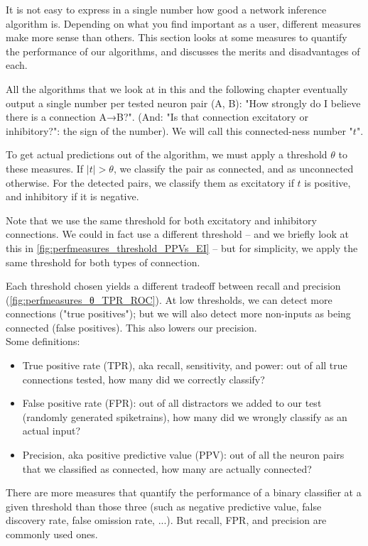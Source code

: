 It is not easy to express in a single number how good a network inference algorithm is. Depending on what you find important as a user, different measures make more sense than others. This section looks at some measures to quantify the performance of our algorithms, and discusses the merits and disadvantages of each.

All the algorithms that we look at in this and the following chapter eventually output a single number per tested neuron pair (A, B): "How strongly do I believe there is a connection A→B?". (And: "Is that connection excitatory or inhibitory?": the sign of the number). We will call this connected-ness number "$t$".

To get actual predictions out of the algorithm,
we must apply a threshold $θ$ to these measures. If $|t| > θ$, we classify the pair as connected, and as unconnected otherwise. For the detected pairs, we classify them as excitatory if $t$ is positive, and inhibitory if it is negative.

Note that we use the same threshold for both excitatory and inhibitory connections. We could in fact use a different threshold -- and we briefly look at this in \cref{fig:perfmeasures_threshold_PPVs_EI} -- but for simplicity, we apply the same threshold for both types of connection.

Each threshold chosen yields a different tradeoff between recall and precision (\cref{fig:perfmeasures_θ_TPR_ROC}). At low thresholds, we can detect more connections ("true positives"); but we will also detect more non-inputs as being connected (false positives). This also lowers our precision.\\
Some definitions:
\begin{itemize}
    \item True positive rate (TPR), aka recall, sensitivity, and power: out of all true connections tested, how many did we correctly classify?
    \item False positive rate (FPR): out of all distractors we added to our test (randomly generated spiketrains), how many did we wrongly classify as an actual input?
    \item Precision, aka positive predictive value (PPV): out of all the neuron pairs that we classified as connected, how many are actually connected?
\end{itemize}

There are more measures that quantify the performance of a binary classifier at a given threshold than those three (such as negative predictive value, false discovery rate, false omission rate, ...).\footnotemark{}
But recall, FPR, and precision are commonly used ones.

